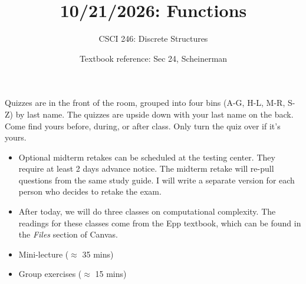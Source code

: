 \documentclass[10pt]{beamer}
\begin{document}






\title{10/21/2026: Functions}
\author{CSCI 246: Discrete Structures}
\date{Textbook reference: Sec 24, Scheinerman}

\begin{frame}
    \titlepage 
\end{frame}


\begin{frame}
\footnotesize 
\begin{mygreenbox}[title=Graded Quiz Pickup]
Quizzes are in the front of the room, grouped into four bins (A-G, H-L, M-R, S-Z) by last name. The quizzes are upside down with your last name on the back. Come find yours before, during, or after class.  Only turn the quiz over if it's yours.
\end{mygreenbox} 
\vfill 

\begin{myredbox}[title=Announcements]
\begin{itemize}
	\item Optional midterm retakes can be scheduled at the testing center.  They require at least 2 days advance notice.   The midterm retake will re-pull questions from the same study guide.  I will write a separate version for each person who decides to retake the exam.  
	\item After today, we will do three classes on computational complexity. The readings for these classes come from the Epp textbook, which can be found in the \textit{Files} section of Canvas.
\end{itemize}
\end{myredbox}

\vfill 


\begin{myyellowbox}[title=Today's Agenda]
\begin{itemize}
	\item Mini-lecture ($\approx$ 35 mins)
	\item Group exercises ($\approx$ 15 mins)
\end{itemize}

%	
\end{myyellowbox}
\vfill 

\end{frame}
\end{document}
